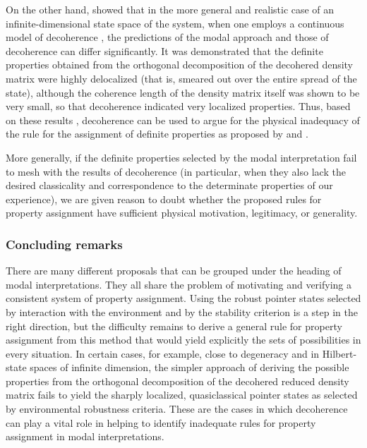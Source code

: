 \documentclass[rmp,aps,amsmath,amsfonts,noshowkeys,noshowpacs,12pt]{revtex4}
\begin{document}
On the other hand, \citet{Bacciagaluppi:2000:yz} showed that in the
more general and realistic case of an infinite-dimensional state space
of the system, when one employs a continuous model of decoherence
\citep[namely, that of][]{Joos:1985:iu}, the predictions of the modal
approach \citep{Dieks:1989:rm,Vermaas:1995:gd} and those of
decoherence can differ significantly. It was demonstrated that the
definite properties obtained from the orthogonal decomposition of the
decohered density matrix were highly delocalized (that is, smeared out
over the entire spread of the state), although the coherence length of
the density matrix itself was shown to be very small, so that
decoherence indicated very localized properties.  Thus, based on these
results \citep[and similar ones of][]{Donald:1998:xz}, decoherence can
be used to argue for the physical inadequacy of the rule for the
assignment of definite properties as proposed by \citet{Dieks:1989:rm}
and \citet{Vermaas:1995:gd}.

More generally, if the definite properties selected by the modal
interpretation fail to mesh with the results of decoherence (in
particular, when they also lack the desired classicality and
correspondence to the determinate properties of our experience), we
are given reason to doubt whether the proposed rules for property
assignment have sufficient physical motivation, legitimacy, or
generality.


\subsubsection{Concluding remarks}

There are many different proposals that can be grouped under the
heading of modal interpretations. They all share the problem of
motivating and verifying a consistent system of property assignment.
Using the robust pointer states selected by interaction with the
environment and by the stability criterion is a step in the right
direction, but the difficulty remains to derive a general rule for
property assignment from this method that would yield explicitly the
sets of possibilities in every situation.  In certain cases, for
example, close to degeneracy and in Hilbert-state spaces of infinite
dimension, the simpler approach of deriving the possible properties
from the orthogonal decomposition of the decohered reduced density
matrix fails to yield the sharply localized, quasiclassical pointer
states as selected by environmental robustness criteria.  These are
the cases in which decoherence can play a vital role in helping to
identify inadequate rules for property assignment in modal
interpretations.
\end{document}
